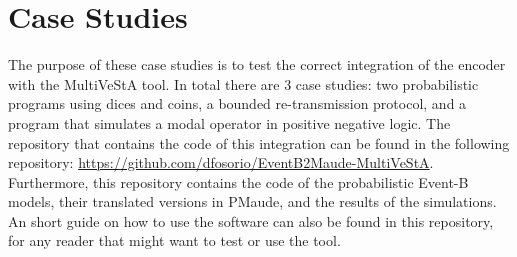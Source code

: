 \chapter{Case Studies}


The purpose of these case studies is to test the correct integration of the encoder with the MultiVeStA tool. In total there are 3 case studies: two probabilistic programs using dices and coins, a bounded re-transmission protocol, and a program that simulates a modal operator in positive negative logic. The repository that contains the code of this integration can be found in the following repository: \url{https://github.com/dfosorio/EventB2Maude-MultiVeStA}. Furthermore, this repository contains the code of the probabilistic Event-B models, their translated versions in PMaude, and the results of the simulations. An short guide on how to use the software can also be found in this repository, for any reader that might want to test or use the tool.



